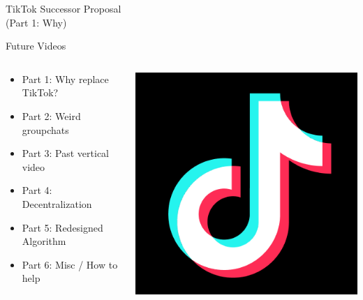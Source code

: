 \documentclass[aspectratio=169]{beamer}
\begin{document}
\begin{frame}
    \centering
    \Huge TikTok Successor Proposal \\
    \Huge (Part 1: Why)
\end{frame}

\begin{frame}{Future Videos}
\begin{columns}[T]
    \begin{column}[T]{0.5\textwidth}
        \begin{itemize}
            \item Part 1: Why replace TikTok?
            \item Part 2: Weird groupchats 
            \item Part 3: Past vertical video
            \item Part 4: Decentralization
            \item Part 5: Redesigned Algorithm
            \item Part 6: Misc / How to help
        \end{itemize}
    \end{column}
    \begin{column}{0.5\textwidth}
        \includegraphics[height=0.8\textheight]{imgs/app_icons/tiktok-icon2.png}
    \end{column}
\end{columns}
\end{frame}
\end{document}
